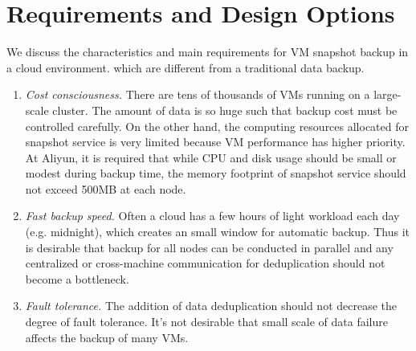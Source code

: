 \section{Requirements and Design Options}
\label{inline:options}
We discuss the characteristics and 
main requirements for VM snapshot backup in a cloud environment.
which are different from a traditional data backup. 
\begin{enumerate}
\item {\em Cost consciousness.}
There are tens of thousands of VMs running on a large-scale cluster. 
The amount of data is so huge such that backup cost must be controlled carefully.
On the other hand, the computing resources allocated for snapshot service is very limited
because VM performance has higher priority.  
At Aliyun, it is required that while CPU and disk usage should be small or modest during backup time,
the memory footprint of snapshot service should not exceed 500MB at each node.

\item {\em Fast backup speed.}
Often a cloud has a few hours of light workload each day (e.g. midnight),  which creates an small window for automatic backup.
Thus it is desirable that backup for all nodes
can be conducted in parallel and any centralized or  cross-machine communication for
deduplication should not become a bottleneck.

\item {\em Fault tolerance.}
The addition of data deduplication should not decrease the degree of
fault tolerance. It's not desirable that small scale of data failure affects the backup of many VMs.
\end{enumerate}

